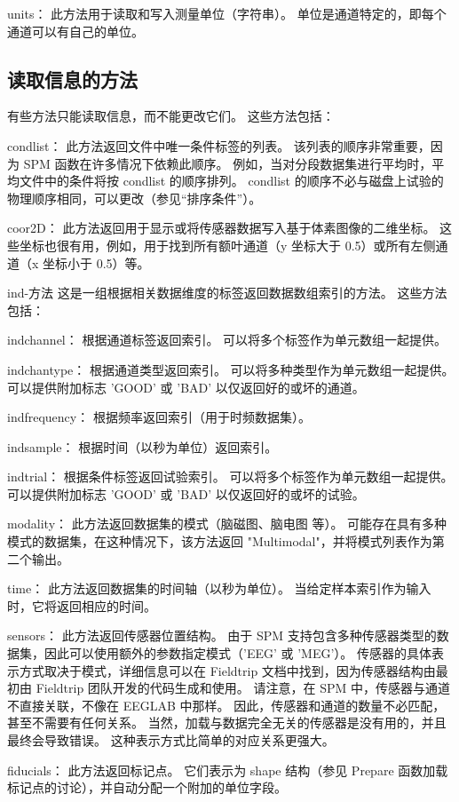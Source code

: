 units：
此方法用于读取和写入测量单位（字符串）。
单位是通道特定的，即每个通道可以有自己的单位。


\subsection{读取信息的方法}

有些方法只能读取信息，而不能更改它们。
这些方法包括：

condlist：
此方法返回文件中唯一条件标签的列表。
该列表的顺序非常重要，因为 SPM 函数在许多情况下依赖此顺序。
例如，当对分段数据集进行平均时，平均文件中的条件将按 condlist 的顺序排列。
condlist 的顺序不必与磁盘上试验的物理顺序相同，可以更改（参见“排序条件”）。

coor2D：
此方法返回用于显示或将传感器数据写入基于体素图像的二维坐标。
这些坐标也很有用，例如，用于找到所有额叶通道（y 坐标大于 0.5）或所有左侧通道（x 坐标小于 0.5）等。


ind-方法
这是一组根据相关数据维度的标签返回数据数组索引的方法。
这些方法包括：

indchannel：
根据通道标签返回索引。
可以将多个标签作为单元数组一起提供。

indchantype：
根据通道类型返回索引。
可以将多种类型作为单元数组一起提供。
可以提供附加标志 'GOOD' 或 'BAD' 以仅返回好的或坏的通道。

indfrequency：
根据频率返回索引（用于时频数据集）。

indsample：
根据时间（以秒为单位）返回索引。

indtrial：
根据条件标签返回试验索引。
可以将多个标签作为单元数组一起提供。
可以提供附加标志 'GOOD' 或 'BAD' 以仅返回好的或坏的试验。

modality：
此方法返回数据集的模式（脑磁图、脑电图 等）。
可能存在具有多种模式的数据集，在这种情况下，该方法返回 "Multimodal"，并将模式列表作为第二个输出。

time：
此方法返回数据集的时间轴（以秒为单位）。
当给定样本索引作为输入时，它将返回相应的时间。

sensors：
此方法返回传感器位置结构。
由于 SPM 支持包含多种传感器类型的数据集，因此可以使用额外的参数指定模式（'EEG' 或 'MEG'）。
传感器的具体表示方式取决于模式，详细信息可以在 Fieldtrip 文档中找到，因为传感器结构由最初由 Fieldtrip 团队开发的代码生成和使用。
请注意，在 SPM 中，传感器与通道不直接关联，不像在 EEGLAB 中那样。
因此，传感器和通道的数量不必匹配，甚至不需要有任何关系。
当然，加载与数据完全无关的传感器是没有用的，并且最终会导致错误。
这种表示方式比简单的对应关系更强大。

fiducials：
此方法返回标记点。
它们表示为 shape 结构（参见 Prepare 函数加载标记点的讨论），并自动分配一个附加的单位字段。

